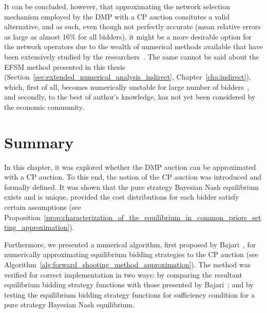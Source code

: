 It can be concluded, however, that approximating the network selection mechanism employed by the DMP with a CP auction consitutes a valid alternative, and as such, even though not perfectly accurate (mean relative errors as large as almost 16\% for all bidders), it might be a more desirable option for the network operators due to the wealth of numerical methods available that have been extensively studied by the researchers~\cite{HubbardPaarsch2011}. The same cannot be said about the EFSM method presented in this thesis (Section~\ref{sec:extended_numerical_analysis_indirect}, Chapter~\ref{cha:indirect}), which, first of all, becomes numerically unstable for large number of bidders~\cite{FibichGavish2011}, and secondly, to the best of author's knowledge, has not yet been considered by the economic community.

\section{Summary} %
\label{sec:summary_approximation}
In this chapter, it was explored whether the DMP auction can be approximated with a CP auction. To this end, the notion of the CP auction was introduced and formally defined. It was shown that the pure strategy Bayesian Nash equilibrium exists and is unique, provided the cost distributions for each bidder satisfy certain assumptions (see Proposition~\ref{prop:characterization_of_the_equilibrium_in_common_priors_setting_approximation}).

Furthermore, we presented a numerical algorithm, first proposed by Bajari~\cite{Bajari2001a}, for numerically approximating equilibrium bidding strategies to the CP auction (see Algorithm~\ref{alg:forward_shooting_method_approximation}). The method was verified for correct implementation in two ways: by comparing the resultant equilibrium bidding strategy functions with those presented by Bajari~\cite{Bajari2001a}; and by testing the equilibrium bidding strategy functions for sufficiency condition for a pure strategy Bayesian Nash equilibrium.

